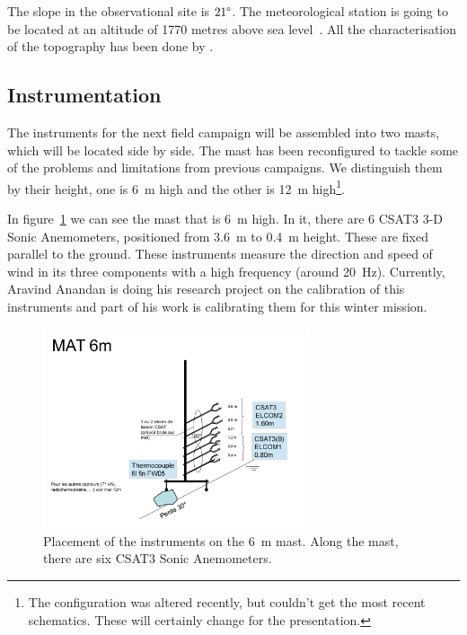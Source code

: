 \documentclass[a4paper,12pt]{article}
\begin{document}
The slope in the observational site is $21\degree$. The meteorological station is going to be located at an altitude of 1770 metres above sea level~\citep{claudine}. All the characterisation of the topography has been done by \cite{alban}.

\subsection{Instrumentation} \label{instrumentation}
The instruments for the next field campaign will be assembled into two masts, which will be located side by side. The mast has been reconfigured to tackle some of the problems and limitations from previous campaigns. We distinguish them by their height, one is 6~m high and the other is 12~m high\footnote{The configuration was altered recently, but couldn't get the most recent schematics. These will certainly change for the presentation.}. 

In figure~\ref{fig:mast_6} we can see the mast that is 6~m high. In it, there are 6 CSAT3 3-D Sonic Anemometers, positioned from 3.6~m to 0.4~m height. These are fixed parallel to the ground. These instruments measure the direction and speed of wind in its three components with a high frequency (around 20~Hz). Currently, Aravind Anandan is doing his research project on the calibration of this instruments and part of his work is calibrating them for this winter mission.

\begin{figure}[!ht]
  \begin{center}
  \includegraphics[width=0.7\textwidth]{fig/0001.jpg}
  \caption{Placement of the instruments on the 6~m mast. Along the mast, there are six CSAT3 Sonic Anemometers.}
  \label{fig:mast_6}
  \end{center}
\end{figure}
\end{document}
